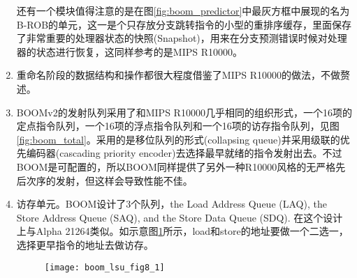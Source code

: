 \begin{enumerate}[label=(\alph*)]
	还有一个模块值得注意的是在图\ref{fig:boom_predictor}中最灰方框中展现的名为B-ROB的单元，这一是个只存放分支跳转指令的小型的重排序缓存，里面保存了非常重要的处理器状态的快照(Snapshot)，用来在分支预测错误时候对处理器的状态进行恢复，这同样参考的是MIPS R10000。
	\item 重命名阶段的数据结构和操作都很大程度借鉴了MIPS R10000的做法，不做赘述。
	\item BOOMv2的发射队列采用了和MIPS R10000几乎相同的组织形式，一个16项的定点指令队列，一个16项的浮点指令队列和一个16项的访存指令队列，见图\ref{fig:boom_total}。采用的是移位队列的形式(collapsing queue)并采用级联的优先编码器(cascading priority encoder)去选择最早就绪的指令发射出去\citep{Celio:EECS-2017-157}。不过BOOM是可配置的，所以BOOM同样提供了另外一种R10000风格的无严格先后次序的发射，但这样会导致性能不佳。
	\item 访存单元。BOOM设计了3个队列，the Load Address Queue (LAQ), the Store Address Queue (SAQ), and the Store Data Queue (SDQ)\citep{BOOMDoc2018}. 在这个设计上与Alpha 21264类似。如示意图\ref{fig:LSU}所示，load和store的地址要做一个二选一，选择更早指令的地址去做访存。
	\begin{figure}[!htbp]
		\centering
		\texttt{[image: boom\_lsu\_fig8\_1]}
		\label{fig:LSU}
	\end{figure}
\end{enumerate}


